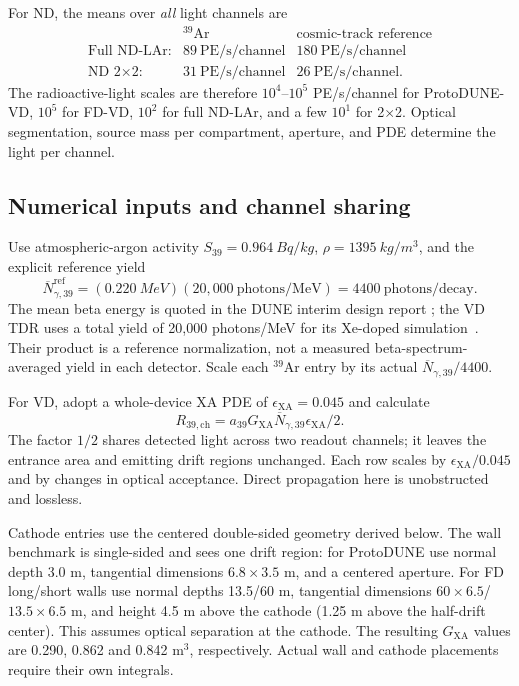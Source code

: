 For ND, the means over \emph{all} light channels are
\begin{equation*}
\begin{array}{lcc}
 & {}^{39}\mathrm{Ar} & \text{cosmic-track reference}\\
\text{Full ND-LAr:} & \boxed{89\ \mathrm{PE/s/channel}} & 180\ \mathrm{PE/s/channel}\\[2pt]
\text{ND 2$\times$2:} & \boxed{31\ \mathrm{PE/s/channel}} & 26\ \mathrm{PE/s/channel}.
\end{array}
\end{equation*}
The radioactive-light scales are therefore $10^4$--$10^5$ PE/s/channel for
ProtoDUNE-VD, $10^5$ for FD-VD, $10^2$ for full ND-LAr, and a few $10^1$
for 2$\times$2. Optical segmentation, source mass per compartment, aperture,
and PDE determine the light per channel.

\subsection{Numerical inputs and channel sharing}

Use atmospheric-argon activity $S_{39}=\SI{0.964}{Bq/kg}$,
$\rho=\SI{1395}{kg/m^3}$, and the explicit reference yield
\begin{equation}
\overline N_{\gamma,39}^{\mathrm{ref}}
=(\SI{0.220}{MeV})(20{,}000\ \mathrm{photons/MeV})=4400\ \mathrm{photons/decay}.
\label{eq:yieldref}
\end{equation}
The mean beta energy is quoted in the DUNE interim design report
\cite{dune_idr}; the VD TDR uses a total yield of 20,000 photons/MeV for
its Xe-doped simulation~\cite{vd_tdr}. Their product is a reference
normalization, not a measured beta-spectrum-averaged yield in each detector.
Scale each $^{39}$Ar entry by its actual $\overline N_{\gamma,39}/4400$.

For VD, adopt a whole-device XA PDE of $\epsilon_{\mathrm{XA}}=0.045$
\cite{fdvd_pde} and calculate
\begin{equation}
\boxed{R_{39,\mathrm{ch}}=a_{39}G_{\mathrm{XA}}
\overline N_{\gamma,39}\epsilon_{\mathrm{XA}}/2.}
\label{eq:VDchannel}
\end{equation}
The factor $1/2$ shares detected light across two readout channels; it
leaves the entrance area and emitting drift regions unchanged.
Each row scales by $\epsilon_{\mathrm{XA}}/0.045$ and by changes in optical
acceptance. Direct propagation here is unobstructed and lossless.

Cathode entries use the centered double-sided geometry derived below.
The wall benchmark is single-sided and sees one drift region: for
ProtoDUNE use normal depth 3.0 m, tangential dimensions $6.8\times3.5$ m,
and a centered aperture. For FD long/short walls use normal depths
13.5/60 m, tangential dimensions $60\times6.5$/$13.5\times6.5$ m, and
height 4.5 m above the cathode (1.25 m above the half-drift center).
This assumes optical separation at the cathode. The resulting
$G_{\mathrm{XA}}$ values are 0.290, 0.862 and 0.842 m$^3$, respectively.
Actual wall and cathode placements require their own integrals.

